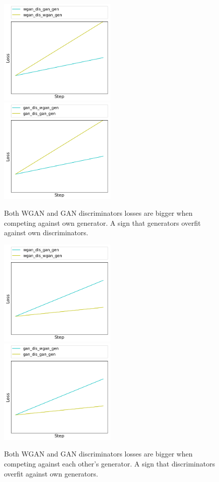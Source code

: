 	\begin{figure}[h!] 
		\includegraphics[width=0.5\textwidth]{figures/ex/gen_overfit_wgan_dis}
		\includegraphics[width=0.5\textwidth]{figures/ex/gen_overfit_gan_dis}
		\caption{Both WGAN and GAN discriminators losses are bigger when competing against own generator. A sign that generators overfit against own discriminators.}
		\label{fig:cd_gen_overfit}
	\end{figure}
	\begin{figure}[h!] 
		\includegraphics[width=0.5\textwidth]{figures/ex/dis_overfit_wgan_dis}
		\includegraphics[width=0.5\textwidth]{figures/ex/dis_overfit_gan_dis}
		\caption{Both WGAN and GAN discriminators losses are bigger when competing against each other's generator. A sign that discriminators overfit against own generators.}
		\label{fig:cd_dis_overfit}	
	\end{figure}	
